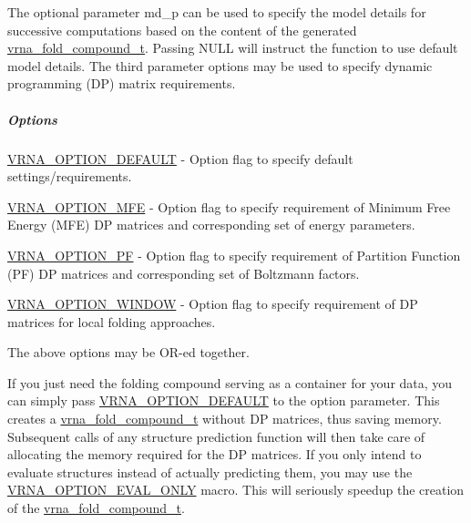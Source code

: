 The optional parameter {\ttfamily md\+\_\+p} can be used to specify the model details for successive computations based on the content of the generated \mbox{\hyperlink{group__fold__compound_ga1b0cef17fd40466cef5968eaeeff6166}{vrna\+\_\+fold\+\_\+compound\+\_\+t}}. Passing N\+U\+LL will instruct the function to use default model details. The third parameter {\ttfamily options} may be used to specify dynamic programming (DP) matrix requirements.

\subparagraph*{Options}


\begin{DoxyItemize}
\item \mbox{\hyperlink{group__fold__compound_gacea5b7ee6181c485f36e2afa0e9089e4}{V\+R\+N\+A\+\_\+\+O\+P\+T\+I\+O\+N\+\_\+\+D\+E\+F\+A\+U\+LT}} -\/ Option flag to specify default settings/requirements.
\item \mbox{\hyperlink{group__fold__compound_gae63be9127fe7dcc1f9bb14f5bb1064ee}{V\+R\+N\+A\+\_\+\+O\+P\+T\+I\+O\+N\+\_\+\+M\+FE}} -\/ Option flag to specify requirement of Minimum Free Energy (M\+FE) DP matrices and corresponding set of energy parameters.
\item \mbox{\hyperlink{group__fold__compound_gabfbadcddda3e74ce7f49035ef8f058f7}{V\+R\+N\+A\+\_\+\+O\+P\+T\+I\+O\+N\+\_\+\+PF}} -\/ Option flag to specify requirement of Partition Function (PF) DP matrices and corresponding set of Boltzmann factors.
\item \mbox{\hyperlink{group__fold__compound_ga2b2a8009ccdccc3eb1571556261aee8e}{V\+R\+N\+A\+\_\+\+O\+P\+T\+I\+O\+N\+\_\+\+W\+I\+N\+D\+OW}} -\/ Option flag to specify requirement of DP matrices for local folding approaches.
\end{DoxyItemize}

The above options may be O\+R-\/ed together.

If you just need the folding compound serving as a container for your data, you can simply pass \mbox{\hyperlink{group__fold__compound_gacea5b7ee6181c485f36e2afa0e9089e4}{V\+R\+N\+A\+\_\+\+O\+P\+T\+I\+O\+N\+\_\+\+D\+E\+F\+A\+U\+LT}} to the {\ttfamily option} parameter. This creates a \mbox{\hyperlink{group__fold__compound_ga1b0cef17fd40466cef5968eaeeff6166}{vrna\+\_\+fold\+\_\+compound\+\_\+t}} without DP matrices, thus saving memory. Subsequent calls of any structure prediction function will then take care of allocating the memory required for the DP matrices. If you only intend to evaluate structures instead of actually predicting them, you may use the \mbox{\hyperlink{group__fold__compound_ga61469c423131552c8483229f8b6c7e0e}{V\+R\+N\+A\+\_\+\+O\+P\+T\+I\+O\+N\+\_\+\+E\+V\+A\+L\+\_\+\+O\+N\+LY}} macro. This will seriously speedup the creation of the \mbox{\hyperlink{group__fold__compound_ga1b0cef17fd40466cef5968eaeeff6166}{vrna\+\_\+fold\+\_\+compound\+\_\+t}}.

